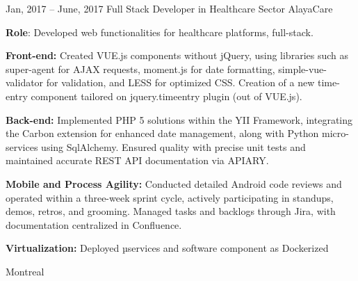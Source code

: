 \documentclass[
  a4paper,
   maincolor=cvblue,
   sectioncolor=cvblue,
   sidebarwidth=0.323\paperwidth,
]{fortysecondscv}
\begin{document}
\begin{cvtableNew}
  \cvitemRightNew
    {Jan, 2017 – June, 2017} %
    {Full Stack Developer in Healthcare Sector} %
    {AlayaCare} %
    {
      \vspace{0.1pt} %
      \fontsize{10.8pt}{12pt}\selectfont %
      \textbf{Role}: Developed web functionalities for healthcare platforms, full-stack.\par
      \vspace{4pt}
      \textbf{Front-end:} Created VUE.js components without jQuery, using libraries such as super-agent for AJAX requests, moment.js for date formatting, simple-vue-validator for validation, and LESS for optimized CSS. Creation of a new time-entry component tailored on jquery.timeentry plugin (out of VUE.js).\par
      \vspace{4pt}
      \textbf{Back-end:} Implemented PHP 5 solutions within the YII Framework, integrating the Carbon extension for enhanced date management, along with Python micro-services using SqlAlchemy. Ensured quality with precise unit tests and maintained accurate REST API documentation via APIARY.\par
      \vspace{4pt}
      \textbf{Mobile and Process Agility:} Conducted detailed Android code reviews and operated within a three-week sprint cycle, actively participating in standups, demos, retros, and grooming. Managed tasks and backlogs through Jira, with documentation centralized in Confluence.\par
      \vspace{4pt}
      \textbf{Virtualization:} Deployed µservices and software component as Dockerized\par
    }
    {Montreal} %

\vspace{2.2mm} %


\end{cvtableNew}
\end{document}
